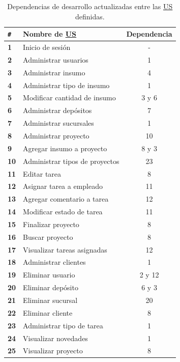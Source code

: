 \documentclass[a4paper, 12pt,twoside]{report}  %
\numberwithin{equation}{subsection} %
\begin{document}
\begin{table}[h!]
	\centering
	\begin{tabular}{ |p{0.5cm}|p{9cm}|c|  }
		\hline
		\verb|#|& \textbf{Nombre de \hyperlink{US}{US}}& \textbf{Dependencia} \\
		\hline
		\textbf{1} & \cellcolor{marca_US_realizada_anterior}Inicio de sesión & - \\
		\hline
		\textbf{2} & \cellcolor{marca_US_realizada_anterior}Administrar usuarios & 1 \\
		\hline
		\textbf{3} & \cellcolor{marca_US_realizada}Administrar insumo & 4 \\
		\hline
		\textbf{4} & \cellcolor{marca_US_realizada}Administrar tipo de insumo & 1 \\
		\hline
		\textbf{5} & \cellcolor{marca_US_realizada}Modificar cantidad de insumo & 3 y 6 \\
		\hline
		\textbf{6} & \cellcolor{marca_US_realizada_anterior}Administrar depósitos & 7 \\
		\hline
		\textbf{7} & \cellcolor{marca_US_realizada_anterior}Administrar sucursales & 1 \\
		\hline
		\textbf{8} & Administrar proyecto & 10 \\
		\hline
		\textbf{9} & Agregar insumo a proyecto & 8 y 3 \\
		\hline
		\textbf{10} & Administrar tipos de proyectos & 23 \\
		\hline
		\textbf{11} & Editar tarea & 8 \\
		\hline
		\textbf{12} & Asignar tarea a empleado & 11\\
		\hline
		\textbf{13} & Agregar comentario a tarea & 12 \\
		\hline
		\textbf{14} & Modificar estado de tarea & 11 \\
		\hline
		\textbf{15} & Finalizar proyecto & 8 \\
		\hline
		\textbf{16} & Buscar proyecto & 8 \\
		\hline
		\textbf{17} & Visualizar tareas asignadas & 12 \\
		\hline
		\textbf{18} & \cellcolor{marca_US_realizada_anterior}Administrar clientes & 1 \\
		\hline
		\textbf{19} & Eliminar usuario & 2 y 12 \\
		\hline
		\textbf{20} & Eliminar depósito & 6 y 3 \\
		\hline
		\textbf{21} & Eliminar sucursal & 20 \\
		\hline
		\textbf{22} & Eliminar cliente & 8 \\
		\hline
		\textbf{23} & \cellcolor{marca_US_realizada}Administrar tipo de tarea & 1 
		\\
		\hline
		\textbf{24} & \cellcolor{marca_US_realizada}Visualizar novedades & 1 
		\\
		\hline
		\textbf{25} & Visualizar proyecto & 8 
		\\
		\hline
	\end{tabular}
	\caption{Dependencias de desarrollo actualizadas entre las \protect\hyperlink{US}{US} definidas.}
	\label{tabla_dependencias_us_it2}
\end{table}
\end{document}
